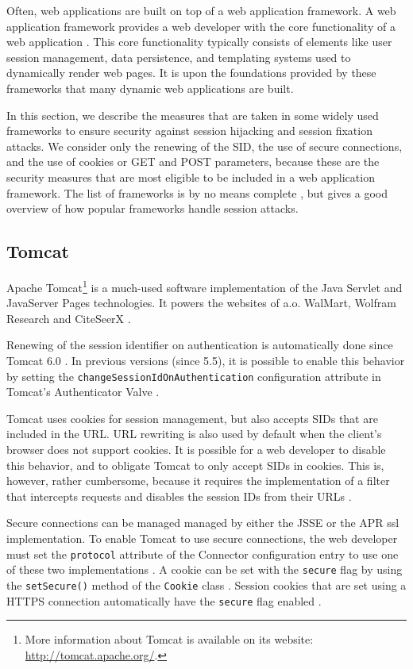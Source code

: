 Often, web applications are built on top of a web application framework. A \gls{web application framework} provides a web developer with the core functionality of a web application \cite{Schwartz2010}. This core functionality typically consists of elements like user session management, data persistence, and templating systems used to dynamically render web pages. It is upon the foundations provided by these frameworks that many dynamic web applications are built.

In this section, we describe the measures that are taken in some widely used frameworks to ensure security against session hijacking and session fixation attacks. We consider only the renewing of the SID, the use of secure connections, and the use of cookies or GET and POST parameters, because these are the security measures that are most eligible to be included in a web application framework. The list of frameworks is by no means complete \cite{FrameworksComparison}, but gives a good overview of how popular frameworks handle session attacks.

\subsection{Tomcat}

Apache Tomcat\footnote{More information about Tomcat is available on its website: \url{http://tomcat.apache.org/}.} is a much-used software implementation of the Java Servlet and JavaServer Pages technologies. It powers the websites of a.o. WalMart, Wolfram Research and CiteSeerX \cite{TomcatPoweredBy}.

Renewing of the session identifier on authentication is automatically done since Tomcat 6.0 \cite{TomcatAuthentication6}. In previous versions (since 5.5), it is possible to enable this behavior by setting the \texttt{changeSessionIdOnAuthentication} configuration attribute in Tomcat's Authenticator Valve \cite{TomcatAuthentication5}.

Tomcat uses cookies for session management, but also accepts SIDs that are included in the URL. URL rewriting is also used by default when the client's browser does not support cookies. It is possible for a web developer to disable this behavior, and to obligate Tomcat to only accept SIDs in cookies. This is, however, rather cumbersome, because it requires the implementation of a filter that intercepts requests and disables the session IDs from their URLs \cite{Condit2006}.

Secure connections can be managed managed by either the JSSE or the APR \gls{ssl} implementation. To enable Tomcat to use secure connections, the web developer must set the \texttt{protocol} attribute of the Connector configuration entry to use one of these two implementations \cite{TomcatSSL}. A cookie can be set with the \texttt{secure} flag by using the \texttt{setSecure()} method of the \texttt{Cookie} class \cite{TomcatCookie}. Session cookies that are set using a HTTPS connection automatically have the \texttt{secure} flag enabled \cite{Funk2004}.

